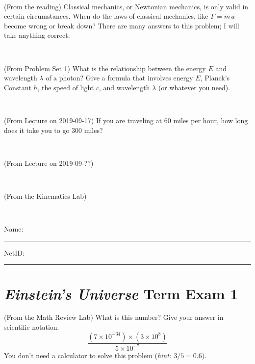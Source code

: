 \documentclass[12pt, letterpaper]{article}
\begin{document}
\vfill ~

\begin{problem} (From the reading)
Classical mechanics, or Newtonian mechanics, is only valid in certain
circumstances. When do the laws of classical mechanics, like $F =
m\,a$ become wrong or break down? There are many answers to this
problem; I will take anything correct.
\end{problem}


\vfill ~


\clearpage


\begin{problem} (From Problem Set 1)
What is the relationship between the energy $E$ and wavelength
$\lambda$ of a photon? Give a formula that involves energy $E$,
Planck's Constant $h$, the speed of light $c$, and wavelength
$\lambda$ (or whatever you need).
\end{problem}

\vfill ~

\begin{problem} (From Lecture on 2019-09-17)
If you are traveling at 60 miles per hour, how long does
it take you to go 300 miles?
\end{problem}


\vfill ~

\begin{problem} (From Lecture on 2019-09-??)
\end{problem}


\vfill ~

\begin{problem} (From the Kinematics Lab)

\end{problem}


\vfill ~


\cleardoublepage



\noindent
Name: \rule[-1ex]{0.60\textwidth}{0.1pt}
NetID: \rule[-1ex]{0.20\textwidth}{0.1pt}

\section*{\textsl{Einstein's Universe} Term Exam 1}
\setcounter{problem}{1}


\begin{problem} (From the Math Review Lab)
What is this number? Give your answer in scientific notation.
$$
\frac{(7\times10^{-34})\times(3\times10^8)}{5\times10^{-7}}
$$
You don't need a calculator to solve this problem (\textit{hint: $3/5=0.6$}).
\end{problem}
\end{document}
